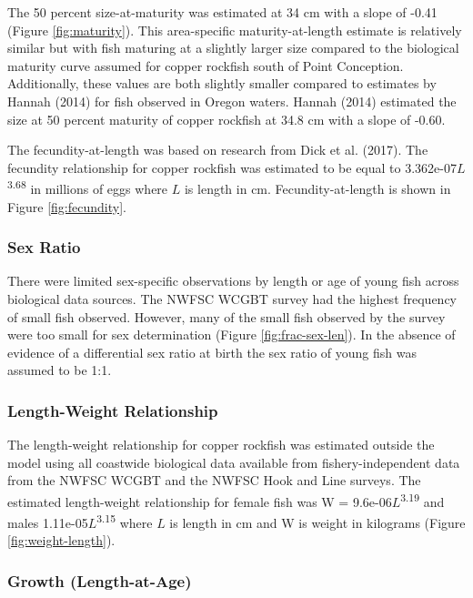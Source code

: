 \documentclass[11pt,
  english,
  letterpaper,
]{article}
\begin{document}
The 50 percent size-at-maturity was estimated at 34 cm with a slope of -0.41 (Figure \ref{fig:maturity}). This area-specific maturity-at-length estimate is relatively similar but with fish maturing at a slightly larger size compared to the biological maturity curve assumed for copper rockfish south of Point Conception. Additionally, these values are both slightly smaller compared to estimates by Hannah (2014) for fish observed in Oregon waters. Hannah (2014) estimated the size at 50 percent maturity of copper rockfish at 34.8 cm with a slope of -0.60.

The fecundity-at-length was based on research from Dick et al. (2017). The fecundity relationship for copper rockfish was estimated to be equal to 3.362e-07\(L\)\textsuperscript{3.68} in millions of eggs where \(L\) is length in cm. Fecundity-at-length is shown in Figure \ref{fig:fecundity}.

\hypertarget{sex-ratio}{%
\subsubsection{Sex Ratio}\label{sex-ratio}}

There were limited sex-specific observations by length or age of young fish across biological data sources. The NWFSC WCGBT survey had the highest frequency of small fish observed. However, many of the small fish observed by the survey were too small for sex determination (Figure \ref{fig:frac-sex-len}). In the absence of evidence of a differential sex ratio at birth the sex ratio of young fish was assumed to be 1:1.

\hypertarget{length-weight-relationship}{%
\subsubsection{Length-Weight Relationship}\label{length-weight-relationship}}

The length-weight relationship for copper rockfish was estimated outside the model using all coastwide biological data available from fishery-independent data from the NWFSC WCGBT and the NWFSC Hook and Line surveys. The estimated length-weight relationship for female fish was W = 9.6e-06\(L\)\textsuperscript{3.19} and males 1.11e-05\(L\)\textsuperscript{3.15} where \(L\) is length in cm and W is weight in kilograms (Figure \ref{fig:weight-length}).

\hypertarget{length-at-age}{%
\subsubsection{Growth (Length-at-Age)}\label{length-at-age}}
\end{document}
